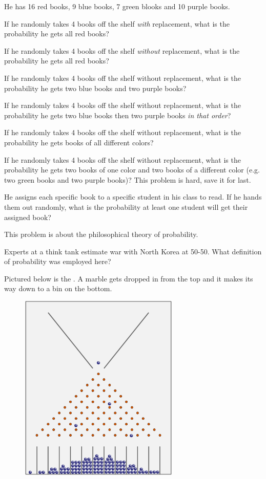 \documentclass[12pt]{article}
\begin{document}
\noindent He has 16 red books, 9 blue books, 7 green blooks and 10 purple books.

\benum
{} If he randomly takes 4 books off the shelf \emph{with} replacement, what is the probability he gets all red books? 

 If he randomly takes 4 books off the shelf \emph{without} replacement, what is the probability he gets all red books? 

  If he randomly takes 4 books off the shelf without replacement, what is the probability he gets two blue books and two purple books? 

  If he randomly takes 4 books off the shelf without replacement, what is the probability he gets two blue books then two purple books \emph{in that order}? 

  If he randomly takes 4 books off the shelf without replacement, what is the probability he gets books of all different colors? 

  If he randomly takes 4 books off the shelf without replacement, what is the probability he gets two books of one color and two books of a different color (e.g. two green books and two purple books)? This problem is hard, save it for last. 

 He assigns each specific book to a specific student in his class to read. If he hands them out randomly, what is the probability at least one student will get their assigned book?

\eenum

\problem This problem is about the philosophical theory of probability.

\benum

 Experts at a think tank estimate war with North Korea at 50-50. What definition of probability was employed here? 

 Pictured below is the . A marble gets dropped in from the top and it makes its way down to a bin on the bottom. 

\begin{figure}[htp]
\centering
\includegraphics[width=3in]{bean.png}
\end{figure}
\end{document}
